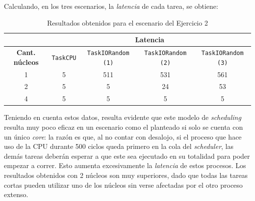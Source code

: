 Calculando, en los tres escenarios, la \emph{latencia} de cada tarea, se obtiene:

\begin{table}[H]
    \begin{center}
        \begin{tabular}{|c|c|c|c|c|}
            \hline
            & \multicolumn{4}{c|}{\textbf{Latencia}} \\ \hline
            \textbf{Cant. núcleos} & \texttt{TaskCPU} & \texttt{TaskIORandom (1)} & \texttt{TaskIORandom (2)} & \texttt{TaskIORandom (3)} \\ \hline
            1 & 5 & 511 & 531 & 561 \\
            2 & 5 & 5 & 24 & 53 \\
            4 & 5 & 5 & 5 & 5 \\ \hline
        \end{tabular}
    \end{center}
    \caption{Resultados obtenidos para el escenario del Ejercicio 2}
\end{table}

Teniendo en cuenta estos datos, resulta evidente que este modelo de
\emph{scheduling} resulta muy poco eficaz en un escenario como el planteado si
solo se cuenta con un único \emph{core}: la razón es que, al no contar con
desalojo, si el proceso que hace uso de la CPU durante 500 ciclos queda primero
en la cola del \emph{scheduler}, las demás tareas deberán esperar a que este
sea ejecutado en su totalidad para poder empezar a correr. Esto aumenta
excesivamente la \emph{latencia} de estos procesos. Los resultados obtenidos
con 2 núcleos son muy superiores, dado que todas las tareas cortas pueden
utilizar uno de los núcleos sin verse afectadas por el otro proceso extenso.
